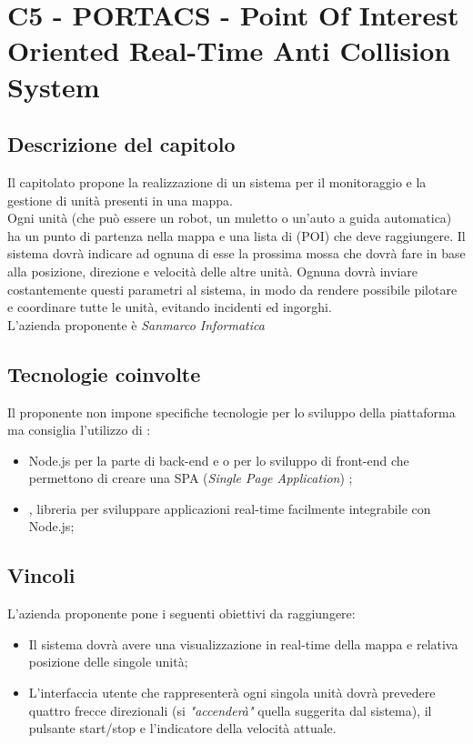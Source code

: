 \section{C5 - PORTACS - Point Of Interest  Oriented Real-Time Anti Collision System}

\subsection{Descrizione del capitolo}
Il capitolato propone la realizzazione di un sistema per il monitoraggio e la gestione di unità presenti in una mappa.\\
Ogni unità (che può essere un robot, un muletto o un'auto a guida automatica) ha un punto di partenza nella mappa e una lista di  (POI) che deve raggiungere.
Il sistema dovrà indicare ad ognuna di esse la prossima mossa che dovrà fare in base alla posizione, direzione e velocità  delle altre unità. Ognuna dovrà inviare costantemente questi parametri al sistema, in modo da rendere possibile pilotare e coordinare tutte le unità, evitando incidenti ed ingorghi.\\
L'azienda proponente è \textit{Sanmarco Informatica}

\subsection{Tecnologie coinvolte}
Il proponente non impone specifiche tecnologie per lo sviluppo della piattaforma ma consiglia l'utilizzo di :
\begin{itemize}
\item Node.js per la parte di back-end e  o   per lo sviluppo di front-end che permettono di creare una SPA (\textit{Single Page Application}) ;
\item {}, libreria per sviluppare applicazioni real-time facilmente integrabile con Node.js;
\end{itemize}

\subsection{Vincoli}
L'azienda proponente pone i seguenti obiettivi da raggiungere:

\begin{itemize}
\item Il sistema dovrà avere una visualizzazione in real-time della mappa e relativa posizione delle singole unità;
\item L'interfaccia utente che rappresenterà ogni singola unità  dovrà prevedere quattro frecce direzionali (si \textit{"accenderà"} quella suggerita dal sistema), il pulsante start/stop e l'indicatore della velocità attuale.
\end{itemize}


